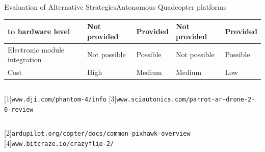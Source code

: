\documentclass[xcolor=table]{beamer}
\begin{document}
\begin{frame}{Evaluation of Alternative Strategies}{Autonomous Quadcopter platforms}
\begin{footnotesize}
\begin{center}
\begin{tabular}{ |p{2cm}|p{2cm}|p{2cm}|p{2cm}|s| }
to hardware level & Not provided & Provided & Not provided & Provided \\
  \hline
  Electronic module integration & Not possible & Possible & Not possible & Possible \\
  \hline
  Cost & High & Medium & Medium & Low \\
  \hline
  \end{tabular}
  \end{center}
  \end{footnotesize}
  
  \begin{tiny}
  \begin{columns}
  [1]\texttt{www.dji.com/phantom-4/info}
  [3]\texttt{www.sciautonics.com/parrot-ar-drone-2-0-review}
  \end{columns}
  \begin{columns}
  [2]\texttt{ardupilot.org/copter/docs/common-pixhawk-overview}
  [4]\texttt{www.bitcraze.io/crazyflie-2/}
  \end{columns}
  \end{tiny}  
    
\end{frame}
\end{document}
